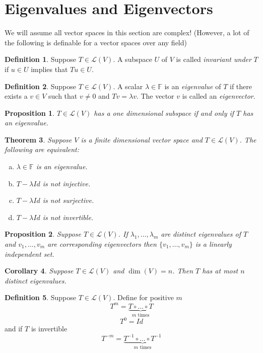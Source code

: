 \documentclass[12pt,letterpaper]{article}
\theoremstyle{plain}
\newtheorem{theorem}{Theorem}[section]
\newtheorem{proposition}{Proposition}[section]
\newtheorem{corollary}[theorem]{Corollary}
\theoremstyle{definition}
\newtheorem{definition}[theorem]{Definition}
\numberwithin{equation}{section}
\begin{document}
\section{Eigenvalues and Eigenvectors}
{\color{red}{\bf \noindent Note: }We will assume all vector spaces in this section are complex! (However, a lot of the following is definable for a vector spaces over any field)}

\begin{definition} Suppose $T\in \mathcal{L}(V)$. A subspace $U$ of $V$ is called \emph{invariant under} $T$ if $u\in U$ implies that $Tu\in U$. 
\end{definition}
\begin{definition}Suppose $T\in \mathcal{L}(V)$. A scalar $\lambda\in \mathbb{F}$ is an \emph{eigenvalue} of $T$ if there exists a $v\in V$ such that $v\neq 0$ and $Tv=\lambda v$. The vector $v$ is called an \emph{eigenvector}.
\end{definition}
\begin{proposition}$T\in \mathcal{L}(V)$ has a one dimensional subspace if and only if $T$ has an eigenvalue. 
\end{proposition}

\begin{theorem}Suppose $V$ is a finite dimensional vector space and $T\in \mathcal{L}(V)$. The following are equivalent:
\begin{enumerate}[(a)]
\item $\lambda\in \mathbb{F}$ is an eigenvalue.
\item $T-\lambda Id$ is not injective.
\item $T-\lambda Id$ is not surjective.
\item $T-\lambda Id$ is not invertible.
\end{enumerate}
\end{theorem}

\begin{proposition} Suppose  $T\in \mathcal{L}(V)$. If $\lambda_1, \ldots, \lambda_m$ are distinct eigenvalues of $T$ and $v_1, \ldots, v_m$ are corresponding eigenvectors then $\{v_1, \ldots, v_m\}$ is a linearly independent set. 
\end{proposition}
\begin{corollary} Suppose $T\in \mathcal{L}(V)$ and $\dim(V)=n$. Then $T$ has at most $n$ distinct eigenvalues. 
\end{corollary}

\begin{definition}Suppose  $T\in \mathcal{L}(V)$. Define for positive $m$
\[T^m=\underbrace{T\circ\ldots\circ T}_{m\text{ times}}\]
\[T^0=Id\]
and if $T$ is invertible
\[T^{-m}=\underbrace{T^{-1}\circ\ldots\circ T^{-1}}_{m\text{ times}}\]
\end{definition}
\end{document}
